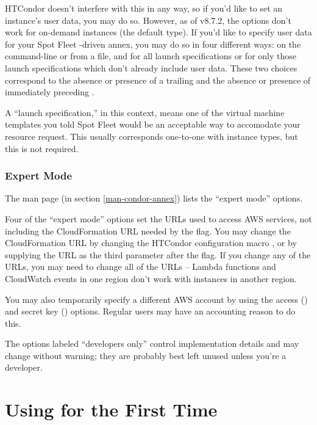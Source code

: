 HTCondor doesn't interfere with this in any way, so if you'd like to set
an instance's user data, you may do so.  However, as of v8.7.2, the
 options don't work for on-demand instances (the default
type).  If you'd like to specify user data for your Spot Fleet -driven
annex, you may do so in four different ways: on the command-line or
from a file, and for all launch specifications or for only those launch
specifications which don't already include user data.  These two choices
correspond to the absence or presence of a trailing  and the
absence or presence of  immediately preceding .

A ``launch specification,'' in this context, means one of the virtual machine
templates you told Spot Fleet would be an acceptable way to accomodate your
resource request.  This usually corresponds one-to-one with instance types,
but this is not required.

\subsubsection{Expert Mode}

The man page (in section \ref{man-condor-annex}) lists the ``expert
mode'' options.

Four of the ``expert mode'' options set the URLs used to access AWS services,
not including the CloudFormation URL needed by the  flag.  You
may change the CloudFormation URL by changing the HTCondor configuration
macro , or by supplying the URL as the third
parameter after the  flag.  If you change any of the URLs,
you may need to change all of the URLs -- Lambda functions and CloudWatch
events in one region don't work with instances in another region.

You may also temporarily specify a different AWS account by using the
access () and
secret key () options.  Regular users may have
an accounting reason to do this.

The options labeled ``developers only'' control implementation details and
may change without warning; they are probably best left unused unless you're
a developer.


\section{Using  for the First Time}
\label{sec:clouds-annex-first-time}

